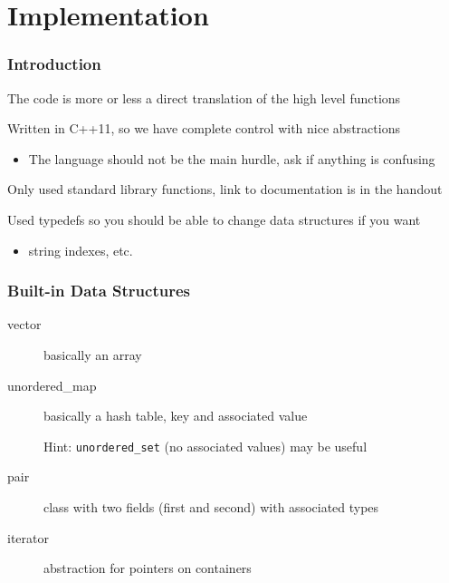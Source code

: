 \documentclass[aspectratio=169,10pt,compress]{beamer}
\begin{document}
\section{Implementation}
\begin{frame}
  \frametitle{Introduction}

  The code is more or less a direct translation of the high level functions

  \vspace{2em}

  Written in C++11, so we have complete control with nice abstractions
  \begin{itemize}
    \item The language should not be the main hurdle, ask if anything is
      confusing
  \end{itemize}

  \vspace{2em}

  Only used standard library functions, link to documentation is in the handout

  \vspace{2em}

  Used {\ttfamily typedef}s so you should be able to change data structures if
  you want
  \begin{itemize}
    \item {\ttfamily string} indexes, etc.
  \end{itemize}
\end{frame}

\begin{frame}
  \frametitle{Built-in Data Structures}

  \begin{description}
    \item[\ttfamily vector] basically an array
    \item[\ttfamily unordered\_map] basically a hash table, key and associated
      value

      Hint: {\tt unordered\_set} (no associated values) may be useful
    \item[\ttfamily pair] class with two fields ({\ttfamily first} and {\ttfamily second})
      with associated types
    \item[\ttfamily iterator] abstraction for pointers on containers
  \end{description}
\end{frame}
\end{document}
